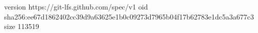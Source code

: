 version https://git-lfs.github.com/spec/v1
oid sha256:ee67d1862402cc39d9a63625e1b0c09273d7965b04f17b62783e1dc5a3a677c3
size 113519
